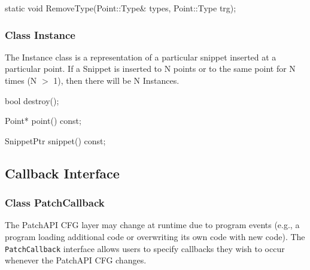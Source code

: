 \begin{apient}
static void RemoveType(Point::Type& types, Point::Type trg);
\end{apient}



\subsubsection{Class Instance}
\label{sec:instance}


The Instance class is a representation of a particular snippet inserted at a
particular point. If a Snippet is inserted to N points or to the same point for
N times (N $>$ 1), then there will be N Instances.


\begin{apient}
bool destroy();
\end{apient}



\begin{apient}
Point* point() const;
\end{apient}



\begin{apient}
SnippetPtr snippet() const;
\end{apient}



\subsection{Callback Interface}
\label{sec:callback-interface}


\subsubsection{Class PatchCallback}
\label{sec:patchcallback}


The PatchAPI CFG layer may change at runtime due to program events
(e.g., a program loading additional code or overwriting its own code
with new code). The \texttt{PatchCallback} interface allows users to
specify callbacks they wish to occur whenever the PatchAPI CFG
changes.

